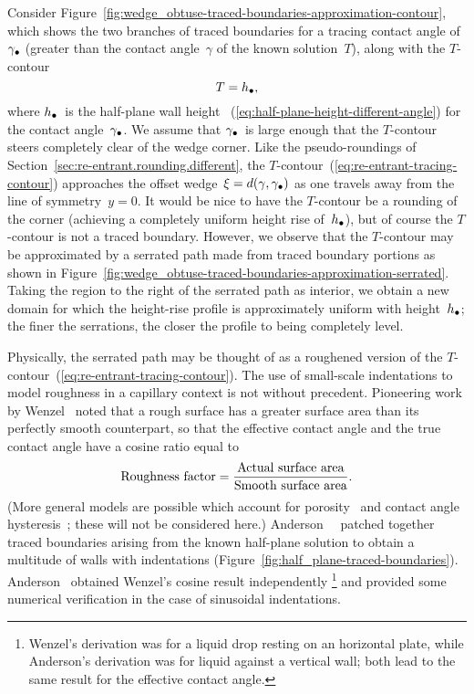 Consider Figure~\ref{fig:wedge_obtuse-traced-boundaries-approximation-contour},
which shows the two branches of traced boundaries
for a tracing contact angle of~$\gamma_\bullet$
(greater than the contact angle~$\gamma$ of the known solution~$T$),
along with the $T$-contour
\begin{equation}
  T = h_\bullet,
  \label{eq:re-entrant-tracing-contour}
\end{equation}
where $h_\bullet$~is the half-plane wall height~%
  (\ref{eq:half-plane-height-different-angle})
for the contact angle~$\gamma_\bullet$.
We assume that $\gamma_\bullet$~is large enough
that the $T$-contour steers completely clear of the wedge corner.
Like the pseudo-roundings of Section~\ref{sec:re-entrant.rounding.different},
the $T$-contour~(\ref{eq:re-entrant-tracing-contour})
approaches the offset wedge~$\xi = d (\gamma, \gamma_\bullet)$
as one travels away from the line of symmetry~$y = 0$.
It would be nice to have the $T$-contour be a rounding of the corner
(achieving a completely uniform height rise of~$h_\bullet$),
but of course the $T$-contour is not a traced boundary.
However, we observe that the $T$-contour may be approximated
by a serrated path made from traced boundary portions
as shown in
Figure~\ref{fig:wedge_obtuse-traced-boundaries-approximation-serrated}.
Taking the region to the right of the serrated path as interior,
we obtain a new domain
for which the height-rise profile is approximately uniform
with height~$h_\bullet$;
the finer the serrations,
the closer the profile to being completely level.

Physically, the serrated path
may be thought of as a roughened version
of the $T$-contour~(\ref{eq:re-entrant-tracing-contour}).
The use of small-scale indentations
to model roughness in a capillary context
is not without precedent.
Pioneering work
by Wenzel~\cite{wenzel-1936-resistance-solid-surfaces-wetting}
noted that a rough surface has a greater surface area
than its perfectly smooth counterpart,
so that the effective contact angle and the true contact angle
have a cosine ratio equal to
\begin{equation}
  \textnormal{Roughness factor} =
    \frac{\textnormal{Actual surface area}}{\textnormal{Smooth surface area}}.
  \label{eq:wenzel-roughness}
\end{equation}
(More general models are possible which account for
porosity~\cite{cassie-1944-wettability-porous-surfaces}
and contact angle hysteresis~\cite{
  cox-1983-spreading-liquid-rough-surface,
  johnson-1964-contact-angle-hysteresis
};
these will not be considered here.)
Anderson~\etal~\cite{anderson-2006-exact-solutions-laplace-young}
patched together traced boundaries
arising from the known half-plane solution
to obtain a multitude of walls with indentations
(Figure~\ref{fig:half_plane-traced-boundaries}).
Anderson~\cite[Section~6.4]{anderson-2002-thesis-boundary-tracing-pdes}
obtained Wenzel's cosine result independently%
\footnote{
  Wenzel's derivation was for a liquid drop resting on an horizontal plate,
  while Anderson's derivation was for liquid against a vertical wall;
  both lead to the same result for the effective contact angle.
}
and provided some numerical verification
in the case of sinusoidal indentations.

